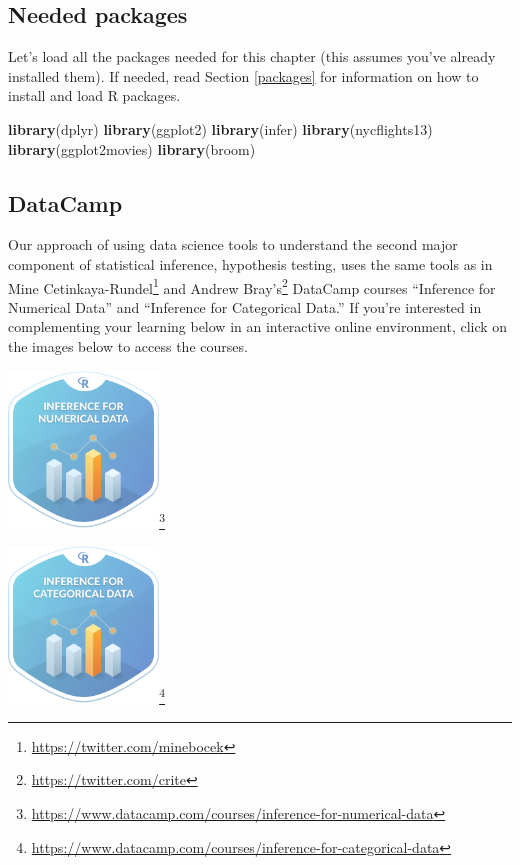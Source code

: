 \documentclass[12pt,]{krantz}
\makeatletter
\newenvironment{Shaded}{\begin{snugshade}}{\end{snugshade}}
\newcommand{\KeywordTok}[1]{\textcolor[rgb]{0.27,0.27,0.27}{\textbf{#1}}}
\newcommand{\NormalTok}[1]{#1}
\renewcommand{\href}[2]{#2\footnote{\url{#1}}}
\newenvironment{kframe}{%
\medskip{}
\setlength{\fboxsep}{.8em}
 \def\at@end@of@kframe{}%
 \ifinner\ifhmode%
  \def\at@end@of@kframe{\end{minipage}}%
  \begin{minipage}{\columnwidth}%
 \fi\fi%
 \def\FrameCommand##1{\hskip\@totalleftmargin \hskip-\fboxsep
 \colorbox{shadecolor}{##1}\hskip-\fboxsep
     \hskip-\linewidth \hskip-\@totalleftmargin \hskip\columnwidth}%
 \MakeFramed {\advance\hsize-\width
   \@totalleftmargin\z@ \linewidth\hsize
   \@setminipage}}%
 {\par\unskip\endMakeFramed%
 \at@end@of@kframe}
\renewenvironment{Shaded}{\begin{kframe}}{\end{kframe}}
\makeatother
\begin{document}
\subsection*{Needed packages}\label{needed-packages-7}


Let's load all the packages needed for this chapter (this assumes you've
already installed them). If needed, read Section \ref{packages} for
information on how to install and load R packages.

\begin{Shaded}
\begin{Highlighting}[]
\KeywordTok{library}\NormalTok{(dplyr)}
\KeywordTok{library}\NormalTok{(ggplot2)}
\KeywordTok{library}\NormalTok{(infer)}
\KeywordTok{library}\NormalTok{(nycflights13)}
\KeywordTok{library}\NormalTok{(ggplot2movies)}
\KeywordTok{library}\NormalTok{(broom)}
\end{Highlighting}
\end{Shaded}

\subsection*{DataCamp}\label{datacamp-6}


Our approach of using data science tools to understand the second major
component of statistical inference, hypothesis testing, uses the same
tools as in \href{https://twitter.com/minebocek}{Mine Cetinkaya-Rundel}
and \href{https://twitter.com/crite}{Andrew Bray's} DataCamp courses
``Inference for Numerical Data'' and ``Inference for Categorical Data.''
If you're interested in complementing your learning below in an
interactive online environment, click on the images below to access the
courses.

\begin{center}
\href{https://www.datacamp.com/courses/inference-for-numerical-data}{\includegraphics[width=0.3\textwidth]{images/datacamp_inference_for_numerical_data.png}}
\end{center}\begin{center}
\href{https://www.datacamp.com/courses/inference-for-categorical-data}{\includegraphics[width=0.3\textwidth]{images/datacamp_inference_for_categorical_data.png}}
\end{center}
\end{document}
